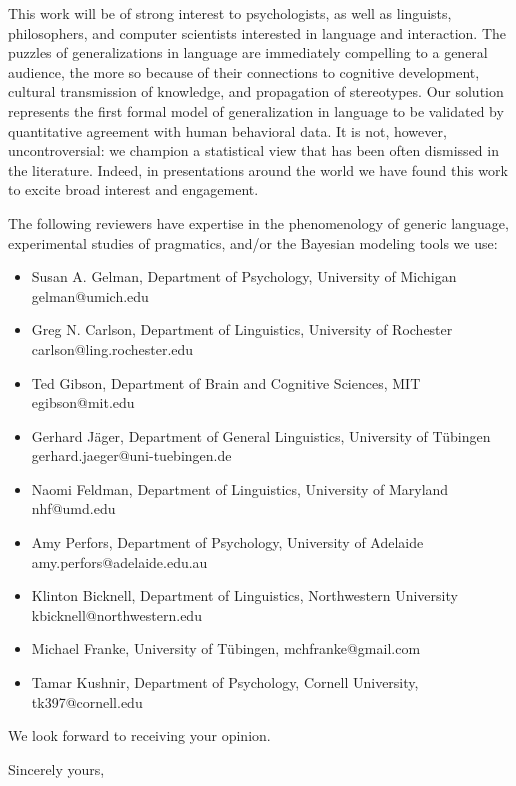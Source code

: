 \documentclass[11pt,letterpaper]{letter} %
\begin{document}
\begin{letter}
This work will be of strong interest to psychologists, as well as linguists, philosophers, and computer scientists interested in language and interaction.
The puzzles of generalizations in language are immediately compelling to a general audience, the more so because of their connections to cognitive development, cultural transmission of knowledge, and propagation of stereotypes.
Our solution represents the first formal model of generalization in language to be validated by quantitative agreement with human behavioral data.
It is not, however, uncontroversial: we champion a statistical view that has been often dismissed in the literature.
Indeed, in presentations around the world we have found this work to excite broad interest and engagement.

The following reviewers have expertise in the phenomenology of generic language, experimental studies of pragmatics, and/or the Bayesian modeling tools we use:

\begin{itemize}
\item Susan A. Gelman, Department of Psychology, University of Michigan gelman@umich.edu
\item Greg N. Carlson, Department of Linguistics, University of Rochester carlson@ling.rochester.edu
\item Ted Gibson, Department of Brain and Cognitive Sciences, MIT egibson@mit.edu
\item Gerhard J{\"a}ger, Department of General Linguistics, University of T{\"u}bingen gerhard.jaeger@uni-tuebingen.de
\item Naomi Feldman, Department of Linguistics, University of Maryland nhf@umd.edu
\item Amy Perfors, Department of Psychology, University of Adelaide amy.perfors@adelaide.edu.au
\item Klinton Bicknell, Department of Linguistics, Northwestern University kbicknell@northwestern.edu
\item Michael Franke, University of T{\"u}bingen, mchfranke@gmail.com
\item Tamar Kushnir, Department of Psychology, Cornell University, tk397@cornell.edu
\end{itemize}

We look forward to receiving your opinion.


\closing{Sincerely yours,}

\end{letter}
\end{document}
